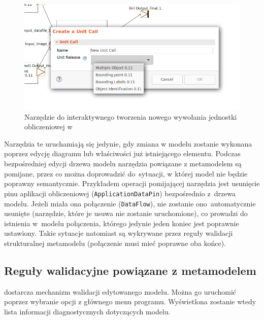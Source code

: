 \begin{figure}[!hb]
	\centering

	\includegraphics[width=0.95\linewidth]{./images/sirius-desktop-create-unit-call-tool.png}
	\caption{Narzędzie do interaktywnego tworzenia nowego wywołania jednostki
		obliczeniowej w~\SiriusDesktop{}}\label{rys:sirius-desktop-create-unit-call-tool}
\end{figure}

Narzędzia te uruchamiają się jedynie, gdy zmiana w modelu zostanie wykonana
poprzez edycję diagramu lub właściwości już istniejącego elementu. Podczas
bezpośredniej edycji drzewa modelu narzędzia powiązane z metamodelem są
pomijane, przez co można doprowadzić do~sytuacji, w której model nie będzie
poprawny
semantycznie. Przykładem operacji pomijającej narzędzia jest usunięcie pinu
aplikacji obliczeniowej (\texttt{ApplicationDataPin}) bezpośrednio z~drzewa
modelu. Jeżeli miała ona połączenie (\texttt{DataFlow}), nie zostanie
ono~automatycznie usunięte (narzędzie, które je usuwa nie zostanie
uruchomione), co
prowadzi do istnienia w~modelu połączenia, którego jedynie jeden koniec jest
poprawnie ustawiony. Takie sytuacje natomiast są wykrywane przez reguły
walidacji strukturalnej metamodelu (połączenie musi mieć poprawne oba końce).

\subsection{Reguły walidacyjne powiązane z
	metamodelem}\label{sec:reguly-walidacyjne-metamodel}

\SiriusDesktop{} dostarcza mechanizm walidacji edytowanego modelu. Można
go uruchomić poprzez wybranie opcji  z głównego menu
programu. Wyświetlona zostanie wtedy lista informacji diagnostycznych
dotyczących modelu.

